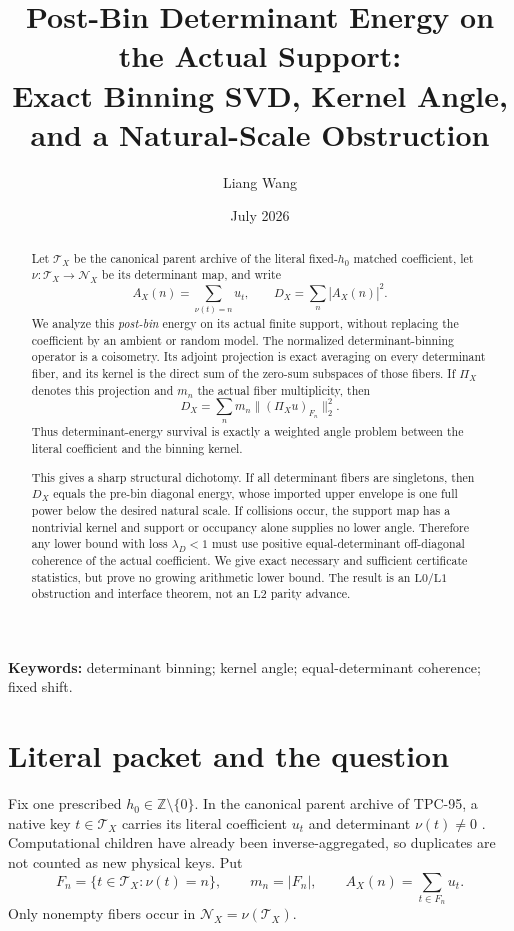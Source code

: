\documentclass[11pt,a4paper]{article}
\title{\bfseries Post-Bin Determinant Energy on the Actual Support:\\
Exact Binning SVD, Kernel Angle, and a Natural-Scale Obstruction}
\author{Liang Wang}
\date{July 2026}
\theoremstyle{definition}
\theoremstyle{remark}
\newcommand{\Z}{\mathbb Z}
\newcommand{\Lzero}{\mathrm{L0}}
\newcommand{\Lone}{\mathrm{L1}}
\newcommand{\Ltwo}{\mathrm{L2}}
\newcommand{\cT}{\mathcal T}
\newcommand{\cN}{\mathcal N}
\begin{document}
\maketitle

\begin{abstract}
Let \(\cT_X\) be the canonical parent archive of the literal
fixed-\(h_0\) matched coefficient, let
\(\nu:\cT_X\to\cN_X\) be its determinant map, and write
\[
 A_X(n)=\sum_{\nu(t)=n}u_t,\qquad
 D_X=\sum_n|A_X(n)|^2.
\]
We analyze this \emph{post-bin} energy on its actual finite support,
without replacing the coefficient by an ambient or random model.
The normalized determinant-binning operator is a coisometry.  Its
adjoint projection is exact averaging on every determinant fiber,
and its kernel is the direct sum of the zero-sum subspaces of those
fibers.  If \(\Pi_X\) denotes this projection and \(m_n\) the actual
fiber multiplicity, then
\[
 D_X=\sum_nm_n\|(\Pi_Xu)_{F_n}\|_2^2.
\]
Thus determinant-energy survival is exactly a weighted angle problem
between the literal coefficient and the binning kernel.

This gives a sharp structural dichotomy.  If all determinant fibers
are singletons, then \(D_X\) equals the pre-bin diagonal energy,
whose imported upper envelope is one full power below the desired
natural scale.  If collisions occur, the support map has a
nontrivial kernel and support or occupancy alone supplies no lower
angle.  Therefore any lower bound with loss
\(\lambda_D<1\) must use positive equal-determinant off-diagonal
coherence of the actual coefficient.  We give exact necessary and
sufficient certificate statistics, but prove no growing arithmetic
lower bound.  The result is an \(\Lzero/\Lone\) obstruction and
interface theorem, not an \(\Ltwo\) parity advance.
\end{abstract}

\medskip
\noindent\textbf{Keywords:} determinant binning; kernel angle;
equal-determinant coherence; fixed shift.

\section{Literal packet and the question}

Fix one prescribed \(h_0\in\Z\setminus\{0\}\).  In the canonical
parent archive of TPC-95, a native key \(t\in\cT_X\) carries its
literal coefficient \(u_t\) and determinant \(\nu(t)\ne0\)
\citep{WangTPC95}.  Computational children have already been
inverse-aggregated, so duplicates are not counted as new physical
keys.  Put
\[
 F_n=\{t\in\cT_X:\nu(t)=n\},\qquad
 m_n=|F_n|,\qquad
 A_X(n)=\sum_{t\in F_n}u_t.
\]
Only nonempty fibers occur in \(\cN_X=\nu(\cT_X)\).
\end{document}
